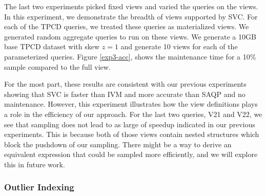 The last two experiments picked fixed views and varied the queries on the views.
In this experiment, we demonstrate the breadth of views supported by SVC.
For each of the TPCD queries, we treated these queries as materialized views.
We generated random aggregate queries to run on these views.
We generate a 10GB base TPCD dataset with skew $z=1$ and generate 10 views for
each of the parameterized queries.
Figure \ref{exp3-acc}, shows the maintenance time for a 10\% sample compared to the full view.

For the most part, these results are consistent with our previous experiments showing that SVC is faster than IVM and more accurate than SAQP and no maintenance.
However, this experiment illustrates how the view definitions plays a role in the efficiency of our approach.
For the last two queries, V21 and V22, we see that sampling does not lead to as large of speedup indicated in our previous experiments.
This is because both of those views contain nested structures which block the pushdown of our sampling.
There might be a way to derive an equivalent expression that could be sampled more efficiently, and we will explore this in future work.

\subsubsection{Outlier Indexing}

